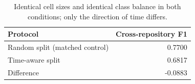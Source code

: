\begin{table}[htbp]
\centering
\caption{Cost of evaluating on a random rather than a chronological split.}
\label{tab:timeaware}
\begin{tabular}{lr}
\toprule
Protocol & Cross-repository F1 \\
\midrule
Random split (matched control) & 0.7700 \\
Time-aware split & 0.6817 \\
\midrule
Difference & -0.0883 \\
\bottomrule
\end{tabular}
\caption*{\footnotesize Identical cell sizes and identical class balance in both conditions; only the direction of time differs.}
\end{table}
